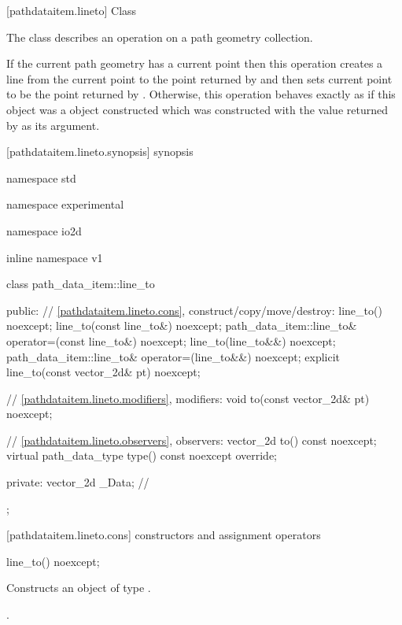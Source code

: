  [pathdataitem.lineto] {Class }

\pnum
{}
The class  describes an operation on a path geometry collection.

\pnum
If the current path geometry has a current point then this operation creates a line from the current point to the point returned by  and then sets current point to be the point returned by . Otherwise, this operation behaves exactly as if this object was a  object constructed which was constructed with the value returned by  as its argument.

 [pathdataitem.lineto.synopsis] { synopsis}

\begin{codeblock}
namespace std { namespace experimental { namespace io2d { inline namespace v1 {
  class path_data_item::line_to {
  public:
    // \ref{pathdataitem.lineto.cons}, construct/copy/move/destroy:
    line_to() noexcept;
    line_to(const line_to&) noexcept;
    path_data_item::line_to& operator=(const line_to&) noexcept;
    line_to(line_to&&) noexcept;
    path_data_item::line_to& operator=(line_to&&) noexcept;
    explicit line_to(const vector_2d& pt) noexcept;

    // \ref{pathdataitem.lineto.modifiers}, modifiers:
    void to(const vector_2d& pt) noexcept;

    // \ref{pathdataitem.lineto.observers}, observers:
    vector_2d to() const noexcept;
    virtual path_data_type type() const noexcept override;
    
  private:
    vector_2d _Data; // \expos
  };
} } } }
\end{codeblock}

 [pathdataitem.lineto.cons] { constructors and assignment operators}

\begin{itemdecl}
    line_to() noexcept;
\end{itemdecl}
\begin{itemdescr}
	\pnum
	\effects
	Constructs an object of type .
	
	\pnum
	\postconditions
	.
\end{itemdescr}

